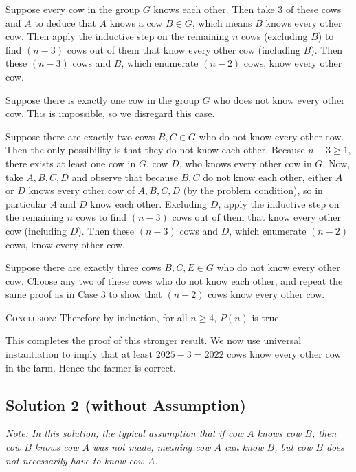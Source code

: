 \documentclass{article}
\begin{document}
    \begin{Cases}
        \item Suppose every cow in the group $G$ knows each other. Then take $3$ of these cows and $A$ to deduce that $A$ knows a cow $B \in G$, which means $B$ knows every other cow. Then apply the inductive step on the remaining $n$ cows (excluding $B$) to find $(n - 3)$ cows out of them that know every other cow (including $B$). Then these $(n - 3)$ cows and $B$, which enumerate $(n - 2)$ cows, know every other cow.
        \item Suppose there is exactly one cow in the group $G$ who does not know every other cow. This is impossible, so we disregard this case.
        \item Suppose there are exactly two cows $B, C \in G$ who do not know every other cow. Then the only possibility is that they do not know each other. Because $n - 3 \ge 1$, there exists at least one cow in $G$, cow $D$, who knows every other cow in $G$. Now, take $A, B, C, D$ and observe that because $B, C$ do not know each other, either $A$ or $D$ knows every other cow of $A, B, C, D$ (by the problem condition), so in particular $A$ and $D$ know each other. Excluding $D$, apply the inductive step on the remaining $n$ cows to find $(n - 3)$ cows out of them that know every other cow (including $D$). Then these $(n - 3)$ cows and $D$, which enumerate $(n - 2)$ cows, know every other cow.
        \item Suppose there are exactly three cows $B, C, E \in G$ who do not know every other cow. Choose any two of these cows who do not know each other, and repeat the same proof as in Case 3 to show that $(n - 2)$ cows know every other cow.
    \end{Cases}
    \textsc{Conclusion}: Therefore by induction, for all $n \ge 4$, $P(n)$ is true.
    
    \vspace{1.5mm}
    This completes the proof of this stronger result. We now use universal instantiation to imply that at least $2025 - 3 = 2022$ cows know every other cow in the farm. Hence the farmer is correct.

\subsection*{Solution 2 (without Assumption)}
    \textit{Note: In this solution, the typical assumption that if cow $A$ knows cow $B$, then cow $B$ knows cow $A$ was not made, meaning cow $A$ can know $B$, but cow $B$ does not necessarily have to know cow $A$.}
    
\end{document}
